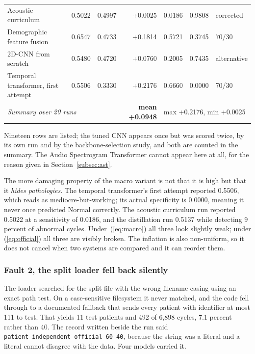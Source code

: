 \documentclass[journal,onecolumn]{IEEEtran}
\newcommand{\best}[1]{\textbf{#1}}
\begin{document}
\begin{table}[!t]
\begin{tabular}{lrrrrrl}
Acoustic curriculum                  & 0.5022 & 0.4997 & +0.0025 & 0.0186 & 0.9808 & corrected \\
Demographic feature fusion           & 0.6547 & 0.4733 & +0.1814 & 0.5721 & 0.3745 & 70/30 \\
2D-CNN from scratch                  & 0.5480 & 0.4720 & +0.0760 & 0.2005 & 0.7435 & alternative \\
Temporal transformer, first attempt  & 0.5506 & 0.3330 & +0.2176 & 0.6660 & 0.0000 & 70/30 \\
\midrule
\multicolumn{3}{l}{\emph{Summary over 20 runs}} & \best{mean +0.0948} & \multicolumn{3}{l}{max +0.2176, min +0.0025} \\
\bottomrule
\end{tabular}

\vspace{2pt}
\footnotesize Nineteen rows are listed; the tuned CNN appears once but was scored twice, by
its own run and by the backbone-selection study, and both are counted in the summary. The
Audio Spectrogram Transformer cannot appear here at all, for the reason given in
Section~\ref{subsec:ast}.
\end{table}

The more damaging property of the macro variant is not that it is high but that it
\emph{hides pathologies}. The temporal transformer's first attempt reported 0.5506, which
reads as mediocre-but-working; its actual specificity is 0.0000, meaning it never once
predicted Normal correctly. The acoustic curriculum run reported 0.5022 at a sensitivity of
0.0186, and the distillation run 0.5137 while detecting 9 percent of abnormal cycles.
Under~(\ref{eq:macro}) all three look slightly weak; under (\ref{eq:official}) all three are
visibly broken. The inflation is also non-uniform, so it does not cancel when two systems are
compared and it can reorder them.

\subsubsection{Fault 2, the split loader fell back silently}
The loader searched for the split file with the wrong filename casing using an exact path
test. On a case-sensitive filesystem it never matched, and the code fell through to a
documented fallback that sends every patient with identifier at most 111 to test. That
yields 11 test patients and 492 of 6,898 cycles, 7.1 percent rather than 40. The record
written beside the run said \texttt{patient\_independent\_official\_60\_40}, because the
string was a literal and a literal cannot disagree with the data. Four models carried it.
\end{document}

